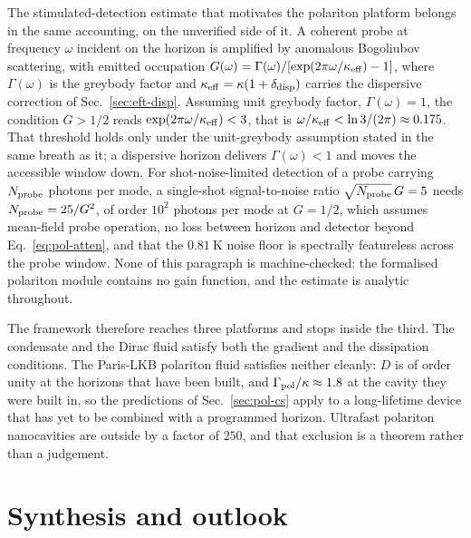 \documentclass[aps,prd,reprint,nofootinbib,superscriptaddress]{revtex4-2}
\begin{document}
The stimulated-detection estimate that motivates the polariton platform
belongs in the same accounting, on the unverified side of it. A coherent
probe at frequency $\omega$ incident on the horizon is amplified by
anomalous Bogoliubov scattering, with emitted occupation
$G(\omega) = \Gamma(\omega)/[\exp(2\pi\omega/\kappa_{\rm eff})-1]$,
where $\Gamma(\omega)$ is the greybody factor and
$\kappa_{\rm eff} = \kappa(1+\delta_{\rm disp})$ carries the dispersive
correction of Sec.~\ref{sec:eft-disp}. Assuming unit greybody factor,
$\Gamma(\omega) = 1$, the condition $G > 1/2$ reads
$\exp(2\pi\omega/\kappa_{\rm eff}) < 3$, that is
$\omega/\kappa_{\rm eff} < \ln 3/(2\pi) \approx 0.175$. That threshold
holds only under the unit-greybody assumption stated in the same breath
as it; a dispersive horizon delivers $\Gamma(\omega) < 1$ and moves the
accessible window down. For shot-noise-limited detection of a probe
carrying $N_{\rm probe}$ photons per mode, a single-shot
signal-to-noise ratio $\sqrt{N_{\rm probe}}\,G = 5$ needs
$N_{\rm probe} = 25/G^2$, of order $10^2$ photons per mode at
$G = 1/2$, which assumes mean-field probe operation, no loss between
horizon and detector beyond Eq.~\eqref{eq:pol-atten}, and that the
$0.81~\mathrm{K}$ noise floor is spectrally featureless across the probe
window. None of this paragraph is machine-checked: the formalised
polariton module contains no gain function, and the estimate is analytic
throughout.

The framework therefore reaches three platforms and stops inside the
third. The condensate and the Dirac fluid satisfy both the gradient and
the dissipation conditions. The Paris-LKB polariton fluid satisfies
neither cleanly: $D$ is of order unity at the horizons that have been
built, and $\Gamma_{\rm pol}/\kappa \approx 1.8$ at the cavity they were
built in, so the predictions of Sec.~\ref{sec:pol-cs} apply to a
long-lifetime device that has yet to be combined with a programmed
horizon. Ultrafast polariton nanocavities are outside by a factor of
$250$, and that exclusion is a theorem rather than a judgement.

\section{Synthesis and outlook}
\label{sec:synthesis}
\end{document}
